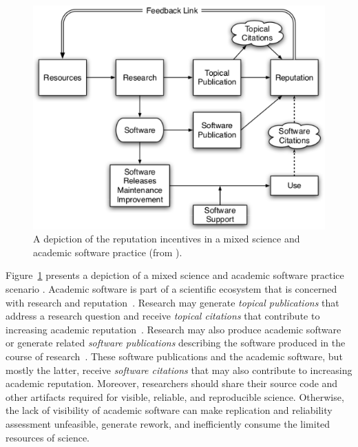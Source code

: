 \begin{figure}[htb]
  \centering
  \includegraphics[scale=0.4]{figs/scientific-reputation-diagram.png}
  \caption{A depiction of the reputation incentives in a mixed science and academic software practice (from \cite{howison2011scientific}).}
  \label{scientific-reputation-diagram}
\end{figure}

Figure~\ref{scientific-reputation-diagram} presents a depiction of a mixed
science and academic software practice scenario \cite{howison2011scientific}.
%
Academic software is part of a scientific ecosystem that is concerned with
research and reputation~\cite{howison2011scientific}.  Research may generate
\textit{topical publications} that address a research question and receive
\textit{topical citations}
that contribute to increasing academic
reputation~\cite{howison2011scientific,howison2015understanding}.  
Research may also produce academic software or
generate related \textit{software publications}
describing the software produced in the course of
research~\cite{howison2015understanding}. These software publications and
the academic software, but mostly the latter, receive \textit{software citations}
that may also contribute to increasing academic reputation.
%
Moreover, researchers should share their source code and other artifacts
required for visible, reliable, and reproducible science. Otherwise, the lack of
visibility of academic software can make replication and reliability assessment
unfeasible, generate rework, and inefficiently consume the limited resources of
science.


